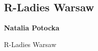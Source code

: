 \documentclass[\main/boa.tex]{subfiles}
\begin{document}
\subsection{R-Ladies Warsaw}

\begin{minipage}{0.915\textwidth}
	\centering
  {\bf {} Natalia Potocka}
\end{minipage}


\begin{affiliations}
\begin{minipage}{0.915\textwidth}
\centering
R-Ladies Warsaw \\[-2pt]
\end{minipage}
\end{affiliations}

\vskip 0.3cm
\end{document}
